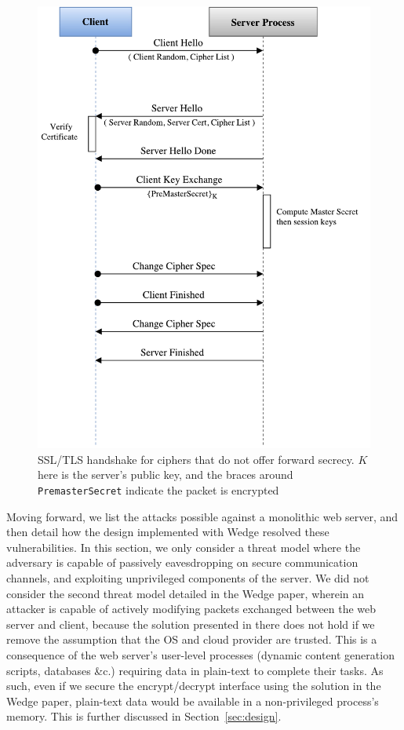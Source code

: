 \documentclass[../main.tex]{subfiles}
\begin{document}
\begin{figure}[H]
  \centering
  \includegraphics[scale=0.4]{images/rsa-handshake-pristine.pdf}
  \caption[SSL/TLS ``RSA'' handshake]{SSL/TLS handshake for ciphers
    that do not offer forward secrecy. $K$ here is the server's public
    key, and the braces around \texttt{PremasterSecret} indicate the
    packet is encrypted}
  \label{fig:pristrsashake}
\end{figure}

Moving forward, we list the attacks possible against a monolithic web
server, and then detail how the design implemented with Wedge resolved
these vulnerabilities. In this section, we only consider a threat
model where the adversary is capable of passively eavesdropping on
secure communication channels, and exploiting unprivileged components
of the server. We did not consider the second threat model detailed in
the Wedge paper, wherein an attacker is capable of actively modifying
packets exchanged between the web server and client, because the
solution presented in there does not hold if we remove the assumption
that the OS and cloud provider are trusted. This is a consequence of
the web server's user-level processes (dynamic content generation
scripts, databases \&c.)  requiring data in plain-text to complete
their tasks. As such, even if we secure the encrypt/decrypt interface
using the solution in the Wedge paper, plain-text data would
be available in a non-privileged process's memory. This is further
discussed in Section~\ref{sec:design}.
\end{document}

